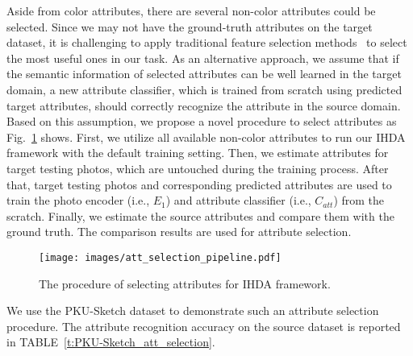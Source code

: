 \documentclass[journal]{IEEEtran}
\begin{document}
   \tabcolsep=8pt
   \begin{table}[!ht]
   \centering
   \caption{Comparison of using color attributes on PKU-Sketch dataset.}
   \label{t:results_PKU-Sketch_color}
   \end{table}


Aside from color attributes, there are several non-color attributes could be selected. Since we may not have the ground-truth attributes on the target dataset, it is challenging to apply traditional feature selection methods~\cite{guyon2003introduction} to select the most useful ones in our task. As an alternative approach, we assume that if the semantic information of selected attributes can be well learned in the target domain, a new attribute classifier, which is trained from scratch using predicted target attributes, should correctly recognize the attribute in the source domain. Based on this assumption, we propose a novel procedure to select attributes as Fig.~\ref{fig:select_att} shows. First, we utilize all available non-color attributes to run our IHDA framework with the default training setting. Then, we estimate attributes for target testing photos, which are untouched during the training process. After that, target testing photos and corresponding predicted attributes are used to train the photo encoder (i.e., $E_{1}$) and attribute classifier (i.e., $C_{att}$) from the scratch. Finally, we estimate the source attributes and compare them with the ground truth. The comparison results are used for attribute selection.

\begin{figure}[!ht]
    \centering
    \texttt{[image: images/att\_selection\_pipeline.pdf]}
    \caption{The procedure of selecting attributes for IHDA framework.}
  \label{fig:select_att}
\end{figure}


We use the PKU-Sketch dataset to demonstrate such an attribute selection procedure. The attribute recognition accuracy on the source dataset is reported in TABLE~\ref{t:PKU-Sketch_att_selection}.
\end{document}
